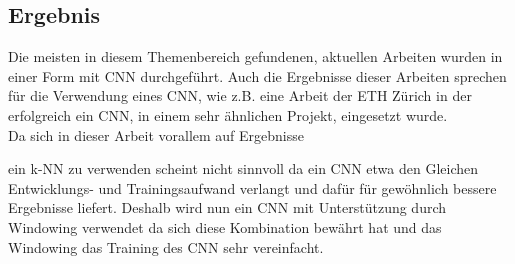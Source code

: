 \subsection{Ergebnis}

Die meisten in diesem Themenbereich gefundenen, aktuellen Arbeiten wurden in einer Form mit \gls{CNN} durchgeführt. Auch die Ergebnisse dieser Arbeiten sprechen für die Verwendung eines \gls{CNN}, wie z.B. eine Arbeit der ETH Zürich \parencite{gomez2018thermal} in der erfolgreich ein \gls{CNN}, in einem sehr ähnlichen Projekt, eingesetzt wurde. \\
Da sich in dieser Arbeit vorallem auf Ergebnisse


ein \gls{k-NN} zu verwenden scheint nicht sinnvoll da ein \gls{CNN} etwa den Gleichen Entwicklungs- und Trainingsaufwand verlangt und dafür für gewöhnlich bessere Ergebnisse liefert.
Deshalb wird nun ein CNN mit Unterstützung durch Windowing verwendet da sich diese Kombination bewährt hat \parencite{gomez2018thermal} und das Windowing das Training des CNN sehr vereinfacht.



